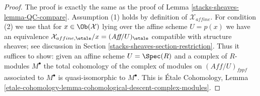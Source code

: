 \begin{proof}
The proof is exactly the same as the proof of Lemma \ref{stacks-sheaves-lemma-QC-compare}.
Assumption (1) holds by definition of $\mathcal{X}_{affine}$.
For condition (2) we use that for $x \in \Ob(\mathcal{X})$
lying over the affine scheme $U = p(x)$ we have an equivalence
$\mathcal{X}_{affine, \etale}/x = (\textit{Aff}/U)_\etale$ compatible
with structure sheaves; see
discussion in Section \ref{stacks-sheaves-section-restriction}.
Thus it suffices to show: given an affine scheme $U = \Spec(R)$
and a complex of $R$-modules $M^\bullet$ the total cohomology
of the complex of modules on $(\textit{Aff}/U)_{fppf}$
associated to $M^\bullet$ is quasi-isomorphic to $M^\bullet$.
This is \'Etale Cohomology, Lemma
\ref{etale-cohomology-lemma-cohomological-descent-complex-modules}.
\end{proof}



